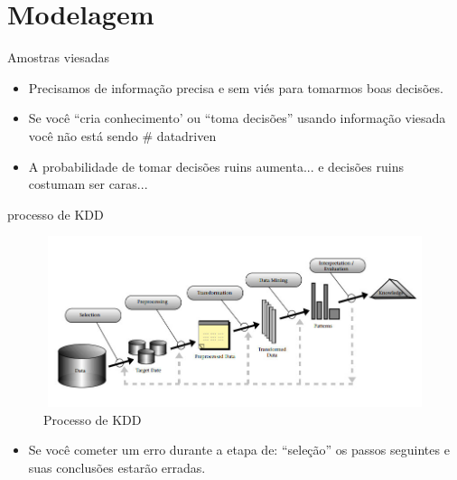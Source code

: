\section{Modelagem}


\begin{frame}	
	\begin{block}{Amostras viesadas}	
		\begin{itemize}
			\item Precisamos de informação precisa e sem viés para tomarmos boas decisões.
			\item Se você ``cria conhecimento' ou ``toma decisões'' usando informação viesada você não está sendo \# datadriven
			\item A probabilidade de tomar decisões ruins aumenta... e decisões ruins costumam ser caras...
		\end{itemize}		
	\end{block}
\end{frame}

\begin{frame}	
	\begin{block}{processo de KDD}	
		\begin{figure}[!htb]
			\centering	  				
			\includegraphics[height=5cm, width = 12cm]{./pic/kddprocess.jpg}
			\caption{Processo de KDD}
			\label{fig_kdd_process}
		\end{figure}
		\begin{itemize}
			\item Se você cometer um erro durante a etapa de: ``seleção'' os passos seguintes e suas conclusões estarão erradas.
		\end{itemize}
	\end{block}
\end{frame}

